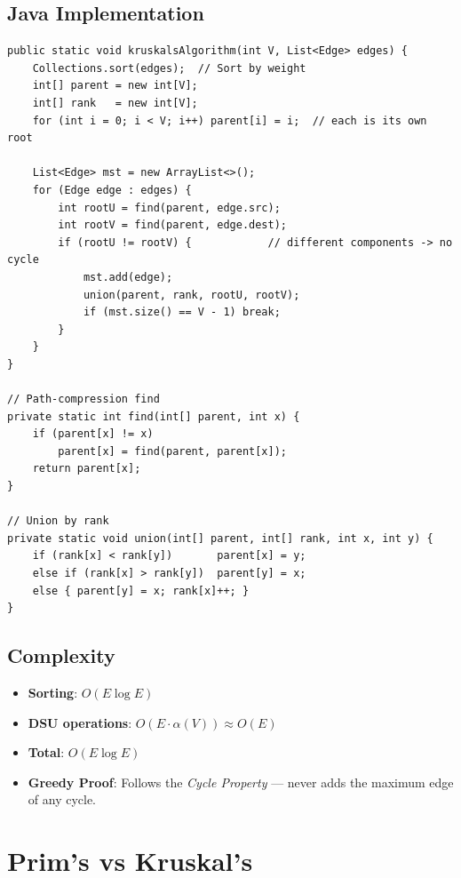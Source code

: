 \documentclass[12pt,a4paper]{article}
\begin{document}
\subsection{Java Implementation}
\begin{lstlisting}[style=javastyle, caption={Kruskal's Algorithm with DSU — Java}]
public static void kruskalsAlgorithm(int V, List<Edge> edges) {
    Collections.sort(edges);  // Sort by weight
    int[] parent = new int[V];
    int[] rank   = new int[V];
    for (int i = 0; i < V; i++) parent[i] = i;  // each is its own root

    List<Edge> mst = new ArrayList<>();
    for (Edge edge : edges) {
        int rootU = find(parent, edge.src);
        int rootV = find(parent, edge.dest);
        if (rootU != rootV) {            // different components -> no cycle
            mst.add(edge);
            union(parent, rank, rootU, rootV);
            if (mst.size() == V - 1) break;
        }
    }
}

// Path-compression find
private static int find(int[] parent, int x) {
    if (parent[x] != x)
        parent[x] = find(parent, parent[x]);
    return parent[x];
}

// Union by rank
private static void union(int[] parent, int[] rank, int x, int y) {
    if (rank[x] < rank[y])       parent[x] = y;
    else if (rank[x] > rank[y])  parent[y] = x;
    else { parent[y] = x; rank[x]++; }
}
\end{lstlisting}

\subsection{Complexity}
\begin{itemize}
    \item \textbf{Sorting}: $O(E \log E)$
    \item \textbf{DSU operations}: $O(E \cdot \alpha(V)) \approx O(E)$
    \item \textbf{Total}: $O(E \log E)$
    \item \textbf{Greedy Proof}: Follows the \textit{Cycle Property} — never adds the maximum edge of any cycle.
\end{itemize}

\newpage

\section{Prim's vs Kruskal's}
\end{document}
